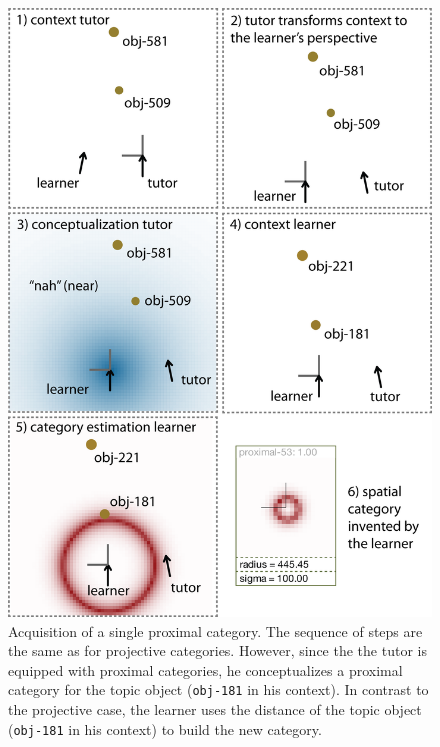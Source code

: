 \begin{figure}
\begin{center}
\includegraphics[width=0.8\columnwidth]{figs/category-acquisition-proximal-single-category-acquisition.png}
\end{center}
\caption[Acquisition of a single proximal category]{Acquisition of a single proximal category. The sequence of steps 
are the same as for projective categories. However, since the the tutor is equipped with
proximal categories, he conceptualizes a proximal category for the topic object ({\footnotesize\tt obj-181} 
in his context). In contrast to the projective case, the learner uses the distance of the 
topic object ({\footnotesize\tt obj-181} in his context) to build the new category.}
\label{f:category-acquisition-proximal-single-acquisition}
\end{figure}

